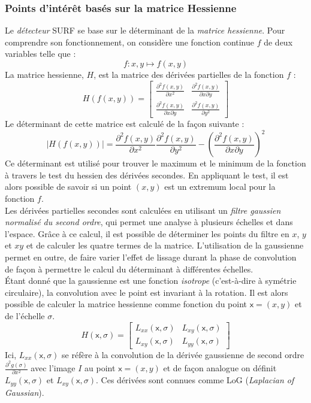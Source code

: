 \documentclass[a4paper,11pt]{report}
\begin{document}
\subsubsection{Points d'intérêt basés sur la matrice Hessienne}
Le \textit{détecteur} SURF se base sur le déterminant de la \textit{matrice hessienne}. Pour comprendre son fonctionnement, on considère une fonction continue $f$ de deux variables telle que :
$$f:x,y\mapsto f(x,y)$$
La matrice hessienne, $H$, est la matrice des dérivées partielles de la fonction $f$ :
$$
H(f(x,y))=
\begin{bmatrix}
\frac {\partial^2 f(x,y)}{\partial x^2} &\frac {\partial^2 f(x,y)}{\partial x \partial y} \\
\frac {\partial^2 f(x,y)}{\partial x \partial y} &\frac {\partial^2 f(x,y)}{\partial y^2}
\end{bmatrix}
$$
Le déterminant de cette matrice est calculé de la façon suivante :
$$\left|H(f(x,y))\right|=\frac{\partial^2 f(x,y)}{\partial x^2} \frac{\partial^2 f(x,y)}{\partial y^2} - \left(\frac{\partial^2 f(x,y)}{\partial x \partial y}\right)^2 $$
Ce déterminant est utilisé pour trouver le maximum et le minimum de la fonction à travers le test du hessien des dérivées secondes. En appliquant le test, il est alors possible de savoir si un point $(x,y)$ est un extremum local pour la fonction $f$.\\
Les dérivées partielles secondes sont calculées en utilisant un \textit{filtre gaussien normalisé du second ordre}, qui permet une analyse à plusieurs échelles et dans l'espace. Grâce à ce calcul, il est possible de déterminer les points du filtre en $x$, $y$ et $xy$ et de calculer les quatre termes de la matrice. L'utilisation de la gaussienne permet en outre, de faire varier l'effet de lissage durant la phase de convolution de façon à permettre le calcul du déterminant à différentes échelles.
\\\'Etant donné que la gaussienne est une fonction \textit{isotrope} (c'est-à-dire à symétrie circulaire), la convolution avec le point est invariant à la rotation. Il est alors possible de calculer la matrice hessienne comme fonction du point $\mathsf{x}=(x,y)$ et de l'échelle $\sigma$.
$$
H(\mathsf{x},\sigma)=
\begin{bmatrix}
L_{xx}(\mathsf{x},\sigma) &L_{xy}(\mathsf{x},\sigma)\\
L_{xy}(\mathsf{x},\sigma) &L_{yy}(\mathsf{x},\sigma)
\end{bmatrix}
$$
Ici, $L_{xx}(\mathsf{x},\sigma)$ se réfère à la convolution de la dérivée gaussienne de second ordre $\frac{\partial^2 g(\sigma)}{\partial x^2}$ avec l'image $I$ au point $\mathsf{x}=(x,y)$ et de façon analogue on définit $L_{yy}(\mathsf{x},\sigma)$ et $L_{xy}(\mathsf{x},\sigma)$. Ces dérivées sont connues comme LoG (\textit{Laplacian of Gaussian}).
\end{document}
